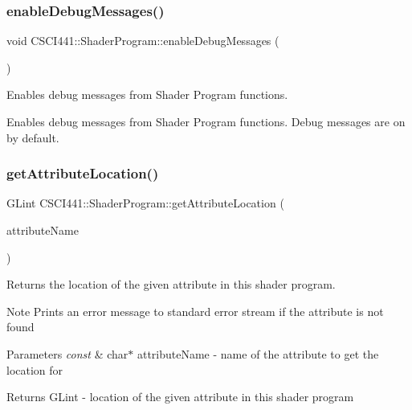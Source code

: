 \subsubsection{\texorpdfstring{enable\+Debug\+Messages()}{enableDebugMessages()}}
{\footnotesize\ttfamily void C\+S\+C\+I441\+::\+Shader\+Program\+::enable\+Debug\+Messages (\begin{DoxyParamCaption}{ }\end{DoxyParamCaption})\hspace{0.3cm}{\ttfamily [static]}}



Enables debug messages from Shader Program functions. 

Enables debug messages from Shader Program functions. Debug messages are on by default. \mbox{\label{class_c_s_c_i441_1_1_shader_program_a6b3373c96832a3dd4e6ba60d965748f5}} 
\subsubsection{\texorpdfstring{get\+Attribute\+Location()}{getAttributeLocation()}}
{\footnotesize\ttfamily G\+Lint C\+S\+C\+I441\+::\+Shader\+Program\+::get\+Attribute\+Location (\begin{DoxyParamCaption}\item[{const char $\ast$}]{attribute\+Name }\end{DoxyParamCaption})}



Returns the location of the given attribute in this shader program. 

\begin{DoxyNote}{Note}
Prints an error message to standard error stream if the attribute is not found 
\end{DoxyNote}

\begin{DoxyParams}{Parameters}
{\em const} & char$\ast$ attribute\+Name -\/ name of the attribute to get the location for \\
\hline
\end{DoxyParams}
\begin{DoxyReturn}{Returns}
G\+Lint -\/ location of the given attribute in this shader program 
\end{DoxyReturn}
\mbox{\label{class_c_s_c_i441_1_1_shader_program_a4b76efbf04fb2ce32f85ba5a7333eb62}} 
